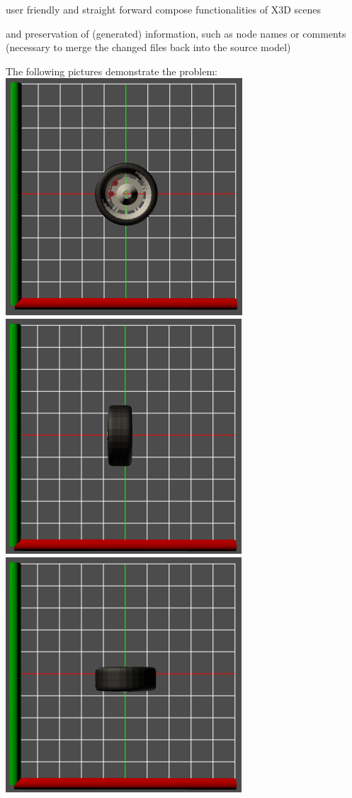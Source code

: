\begin{itemize*}
\item
  user friendly and straight forward compose functionalities of X3D
  scenes
\item
  and preservation of (generated) information, such as node names or
  comments (necessary to merge the changed files back into the source
  model)
\end{itemize*}

The following pictures demonstrate the problem:\\
\includegraphics{../assets/wheel1.png}
\includegraphics{../assets/wheel2.png}
\includegraphics{../assets/wheel3.png}

